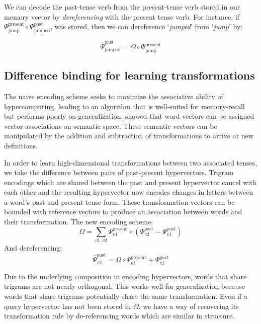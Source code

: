 \documentclass{article}
\begin{document}
We can decode the past-tense verb from the present-tense verb stored in our memory vector by \emph{dereferencing} with the present tense verb. For instance, if $\Psi_{\text{jump}}^{\text{present}} \circ \Psi_{\text{jumped}}^{\text{past}}$, was stored, then we can dereference `\emph{jumped}' from `\emph{jump}' by:

\begin{equation}
\hat{\Psi}_{\text{jumped}}^{\text{past}} = \Omega \circ \Psi_{\text{jump}}^{\text{present}}
\end{equation}

\subsection{Difference binding for learning transformations}
The naive encoding scheme seeks to maximize the associative ability of hypercomputing, leading to an algorithm that is well-suited for memory-recall but performs poorly on generalization. \citet{Mikolov2013} showed that word vectors can be assigned vector associations on semantic space. These semantic vectors can be manipulated by the addition and subtraction of transformations to arrive at new definitions.

In order to learn high-dimensional transformations between two associated tenses, we take the difference between pairs of past-present hypervectors. Trigram encodings which are shared between the past and present hypervector cancel with each other and the resulting hypervector now encodes changes in letters between a word's past and present tense form. These transformation vectors can be bounded with reference vectors to produce an association between words and their transformation. The new encoding scheme:
 \begin{equation}
 \label{eq:diff_wickel_ref}
 \Omega =  \sum_{v1, v2} \Psi^{\text{present}}_{v1} \circ (\Psi^{\text{past}}_{v2} - \Psi^{\text{past}}_{v1})
 \end{equation}
 And dereferencing:
 \begin{equation}
 \label{eq:diff_wickel_deref}
 \hat{\Psi}^{\text{past}}_{v2} = \Omega \circ \Psi^{\text{present}}_{v1} + \Psi^{\text{past}}_{v1}
 \end{equation}
 
Due to the underlying composition in encoding hypervectors, words that share trigrams are not nearly orthogonal. This works well for generalization because words that share trigrams potentially share the same transformation. Even if a query hypervector has not been stored in $\Omega$, we have a way of recovering its transformation rule by de-referencing words which are similar in structure.
\end{document}
